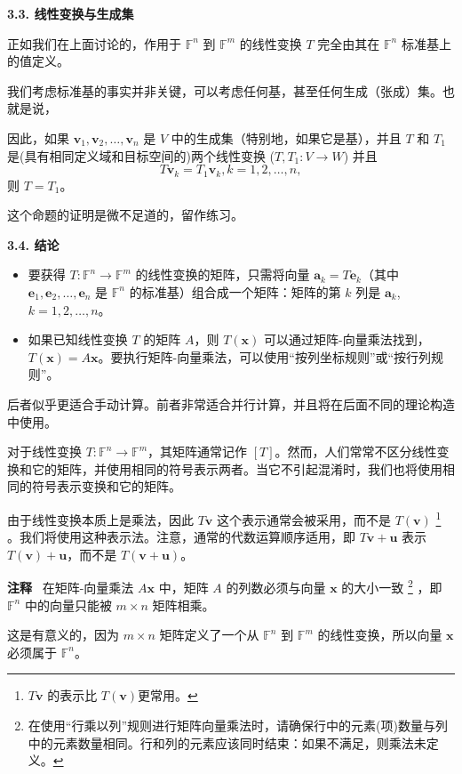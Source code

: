 \textbf{3.3. 线性变换与生成集}

正如我们在上面讨论的，作用于 $\mathbb{F}^n$ 到 $\mathbb{F}^m$ 的线性变换 $T$ 完全由其在 $\mathbb{F}^n$ 标准基上的值定义。

我们考虑标准基的事实并非关键，可以考虑任何基，甚至任何生成（张成）集。也就是说，

因此，如果 $\mathbf{v}_1, \mathbf{v}_2, \dots, \mathbf{v}_n$ 是 $V$ 中的生成集（特别地，如果它是基），并且 $T$ 和 $T_1$ 是(具有相同定义域和目标空间的)两个线性变换 ($T, T_1: V \to W$) 并且 $$T \mathbf{v}_k = T_1 \mathbf{v}_k, k = 1, 2, \dots, n,$$ 
则 $T = T_1$。

这个命题的证明是微不足道的，留作练习。

\textbf{3.4. 结论}
\begin{itemize}
\item 要获得 $T: \mathbb{F}^n \to \mathbb{F}^m$ 的线性变换的矩阵，只需将向量 $\mathbf{a}_k = T \mathbf{e}_k$（其中 $\mathbf{e}_1, \mathbf{e}_2, \dots, \mathbf{e}_n$ 是 $\mathbb{F}^n$ 的标准基）组合成一个矩阵：矩阵的第 $k$ 列是 $\mathbf{a}_k$, $k = 1, 2, \dots, n$。
\item 如果已知线性变换 $T$ 的矩阵 $A$，则 $T(\mathbf{x})$ 可以通过矩阵-向量乘法找到，$T(\mathbf{x}) = A \mathbf{x}$。要执行矩阵-向量乘法，可以使用“按列坐标规则”或“按行列规则”。
\end{itemize}
后者似乎更适合手动计算。前者非常适合并行计算，并且将在后面不同的理论构造中使用。

对于线性变换 $T: \mathbb{F}^n \to \mathbb{F}^m$，其矩阵通常记作 $[T]$。然而，人们常常不区分线性变换和它的矩阵，并使用相同的符号表示两者。当它不引起混淆时，我们也将使用相同的符号表示变换和它的矩阵。

由于线性变换本质上是乘法，因此 $T \mathbf{v}$ 这个表示通常会被采用，而不是 $T(\mathbf{v})$
\footnote{
$T \mathbf{v}$ 的表示比 $T(\mathbf{v})$更常用。
}
。我们将使用这种表示法。注意，通常的代数运算顺序适用，即 $T \mathbf{v} + \mathbf{u}$ 表示 $T(\mathbf{v}) + \mathbf{u}$，而不是 $T(\mathbf{v} + \mathbf{u})$。

\textbf{注释}~ 在矩阵-向量乘法 $A \mathbf{x}$ 中，矩阵 $A$ 的列数必须与向量 $\mathbf{x}$ 的大小一致
\footnote{
在使用“行乘以列”规则进行矩阵向量乘法时，请确保行中的元素(项)数量与列中的元素数量相同。行和列的元素应该同时结束：如果不满足，则乘法未定义。
}
，即 $\mathbb{F}^n$ 中的向量只能被 $m \times n$ 矩阵相乘。

这是有意义的，因为 $m \times n$ 矩阵定义了一个从 $\mathbb{F}^n$ 到 $\mathbb{F}^m$ 的线性变换，所以向量 $\mathbf{x}$ 必须属于 $\mathbb{F}^n$。

